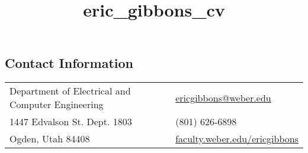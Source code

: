 \documentclass[margin,line,pifont]{res}
\begin{document}
\title{eric_gibbons_cv}
\begin{resume}

  \section{\sc Contact Information}

  \vspace{.05in}
  \begin{tabular}{@{}p{3.5in}p{2.5in}}
    Department of Electrical and Computer Engineering & \href{mailto:ericgibbons@weber.edu}{ericgibbons@weber.edu} \\
    1447 Edvalson St. Dept. 1803                      & (801) 626-6898                                             \\
    Ogden, Utah 84408                                 & \url{faculty.weber.edu/ericgibbons}                        \\
  \end{tabular}

  
  
  
  
  
  
  


\end{resume}
\end{document}

